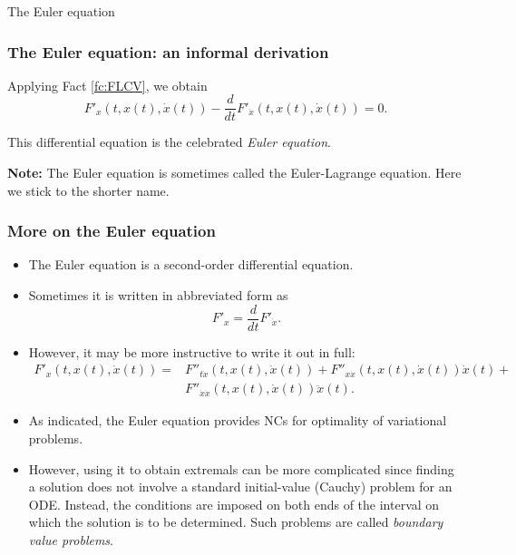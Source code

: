 \documentclass[10pt]{beamer}
\theoremstyle{definition}
\begin{document}
\begin{section}{The Euler equation}
\begin{frame}[fragile]
\frametitle{The Euler equation: an informal derivation}
Applying Fact \ref{fc:FLCV}, we obtain \begin{equation}
F'_x(t,x(t),\dot{x}(t)) - \frac{d}{dt}F'_{\dot{x}}(t,x(t),\dot{x}(t)) = 0.
\label{eq:Euler}
\end{equation}

This differential equation is the celebrated \emph{Euler equation}.\bigskip

\textbf{Note:} The Euler equation is sometimes called the Euler-Lagrange equation. Here we stick to the shorter name.
\end{frame}

\begin{frame}[fragile]
\frametitle{More on the Euler equation}
\begin{itemize}
\item The Euler equation is a second-order differential equation.
\item Sometimes it is written in abbreviated form as \[ F'_x = \frac{d}{dt}F'_{\dot{x}}. \]
\item However, it may be more instructive to write it out in full:
\[ \begin{split}
F'_x(t,x(t),\dot{x}(t)) = & F''_{t\dot{x}}(t,x(t),\dot{x}(t))+ F''_{x\dot{x}}(t,x(t),\dot{x}(t))\dot{x}(t)+\\
& F''_{\dot{x}\dot{x}}(t,x(t),\dot{x}(t))\ddot{x}(t).
\end{split}  \]
\item As indicated, the Euler equation provides NCs for optimality of variational problems.
\item However, using it to obtain extremals can be more complicated since finding a solution does not involve a standard initial-value (Cauchy) problem for an ODE. Instead, the conditions are imposed on both ends of the interval on which the solution is to be determined. Such problems are called \emph{boundary value problems}.
\end{itemize}
\end{frame}


\end{section}
\end{document}
